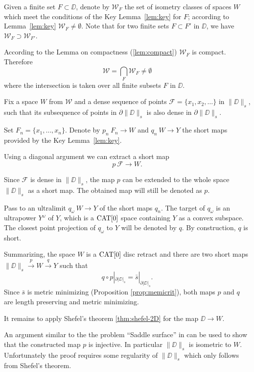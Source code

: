 \documentclass{article}
\begin{document}
Given a finite set $F\subset \DD$,
denote by $\mathcal{W}_F$
the set of isometry classes of spaces $W$ which meet the conditions of the Key Lemma~\ref{lem:key}
for $F$;
according to Lemma~\ref{lem:key} $\mathcal{W}_F\ne\emptyset$.
Note that for two finite sets $F\subset F'$ in $\DD$,
we have $\mathcal{W}_F\supset \mathcal{W}_{F'}$.

According to the Lemma on compactness (\ref{lem:compact}) $\mathcal{W}_F$ is compact.
Therefore 
\[\mathcal{W}
=
\bigcap_{F}\mathcal{W}_F\ne \emptyset\]
where the intersection is taken over all finite subsets $F$ in $\DD$. 

Fix a space $W$ from $\mathcal{W}$
and a dense sequence of points $\mathcal{F}=\{x_1,x_2,\dots\}$ in $\|\DD\|_s$, 
such that its subsequence of points in $\partial \|\DD\|_s$ is
 also dense in $\partial \|\DD\|_s$.

Set $F_n=\{x_1,\dots,x_n\}$.
Denote by $p_n\:F_n\to W$ and $q_n\:W\to Y$ the short maps provided by the Key Lemma~\ref{lem:key}.

Using a diagonal argument we can extract a short map 
\[p\:\mathcal{F}\to W.\]

Since $\mathcal{F}$ is dense in $\|\DD\|_s$,
the map $p$ can be extended to the whole space $\|\DD\|_s$ 
as a short map.
The obtained map will still be denoted as $p$.

Pass to an ultralimit $q_\omega\:W\to Y$ of the short maps $q_n$.
The target of $q_\omega$ is an ultrapower  $Y^\omega$ of $Y$,
which is a $\mathop{\rm CAT}\nolimits[0]$ space containing $Y$ as a convex subspace.
The closest point projection of $q_\omega$ to $Y$ will be denoted by $q$.
By construction, $q$ is short.


Summarizing, the space $W$ is a $\mathop{\rm CAT}\nolimits[0]$ disc retract and
 there are two short maps 
$\|\DD\|_s\xrightarrow{p} W \xrightarrow{q} Y$
such that 
\[q\circ p|_{\partial|\DD|_s}=\bar s|_{\partial|\DD|_s}.\] 
Since $\bar s$ is metric minimizing (Proposition \ref{prop:memicrit}), both maps $p$ and $q$ are length preserving and metric minimizing.

It remains to apply Shefel's theorem \ref{thm:shefel-2D} for the map $\DD\to W$.
\qeds



An argument similar to the the problem ``Saddle surface'' in \cite{petrunin-orthodox} can be used to show that the constructed map $p$ is injective. 
In particular $\|\DD\|_s$ is isometric to $W$.
Unfortunately the proof requires some regularity of $\|\DD\|_s$ which only follows from Shefel's theorem. 
\end{document}
